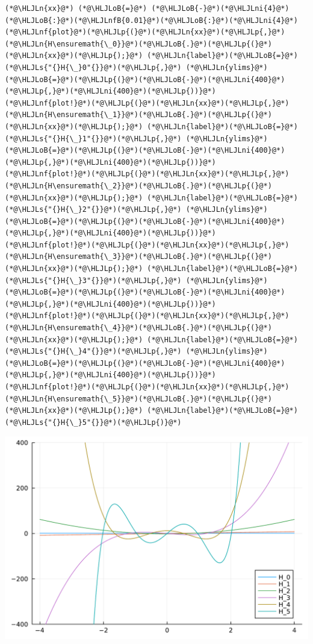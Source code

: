\documentclass[12pt,a4paper]{article}
\newcommand{\HLJLn}[1]{#1}
\newcommand{\HLJLnf}[1]{\textcolor[RGB]{66,102,213}{#1}}
\newcommand{\HLJLs}[1]{\textcolor[RGB]{201,61,57}{#1}}
\newcommand{\HLJLnfB}[1]{\textcolor[RGB]{59,151,46}{#1}}
\newcommand{\HLJLni}[1]{\textcolor[RGB]{59,151,46}{#1}}
\newcommand{\HLJLoB}[1]{\textcolor[RGB]{102,102,102}{\textbf{#1}}}
\newcommand{\HLJLp}[1]{#1}
\begin{document}
\begin{lstlisting}
(*@\HLJLn{xx}@*) (*@\HLJLoB{=}@*) (*@\HLJLoB{-}@*)(*@\HLJLni{4}@*)(*@\HLJLoB{:}@*)(*@\HLJLnfB{0.01}@*)(*@\HLJLoB{:}@*)(*@\HLJLni{4}@*)
(*@\HLJLnf{plot}@*)(*@\HLJLp{(}@*)(*@\HLJLn{xx}@*)(*@\HLJLp{,}@*) (*@\HLJLn{H\ensuremath{\_0}}@*)(*@\HLJLoB{.}@*)(*@\HLJLp{(}@*)(*@\HLJLn{xx}@*)(*@\HLJLp{);}@*) (*@\HLJLn{label}@*)(*@\HLJLoB{=}@*)(*@\HLJLs{"{}H{\_}0"{}}@*)(*@\HLJLp{,}@*) (*@\HLJLn{ylims}@*)(*@\HLJLoB{=}@*)(*@\HLJLp{(}@*)(*@\HLJLoB{-}@*)(*@\HLJLni{400}@*)(*@\HLJLp{,}@*)(*@\HLJLni{400}@*)(*@\HLJLp{))}@*)
(*@\HLJLnf{plot!}@*)(*@\HLJLp{(}@*)(*@\HLJLn{xx}@*)(*@\HLJLp{,}@*) (*@\HLJLn{H\ensuremath{\_1}}@*)(*@\HLJLoB{.}@*)(*@\HLJLp{(}@*)(*@\HLJLn{xx}@*)(*@\HLJLp{);}@*) (*@\HLJLn{label}@*)(*@\HLJLoB{=}@*)(*@\HLJLs{"{}H{\_}1"{}}@*)(*@\HLJLp{,}@*) (*@\HLJLn{ylims}@*)(*@\HLJLoB{=}@*)(*@\HLJLp{(}@*)(*@\HLJLoB{-}@*)(*@\HLJLni{400}@*)(*@\HLJLp{,}@*)(*@\HLJLni{400}@*)(*@\HLJLp{))}@*)
(*@\HLJLnf{plot!}@*)(*@\HLJLp{(}@*)(*@\HLJLn{xx}@*)(*@\HLJLp{,}@*) (*@\HLJLn{H\ensuremath{\_2}}@*)(*@\HLJLoB{.}@*)(*@\HLJLp{(}@*)(*@\HLJLn{xx}@*)(*@\HLJLp{);}@*) (*@\HLJLn{label}@*)(*@\HLJLoB{=}@*)(*@\HLJLs{"{}H{\_}2"{}}@*)(*@\HLJLp{,}@*) (*@\HLJLn{ylims}@*)(*@\HLJLoB{=}@*)(*@\HLJLp{(}@*)(*@\HLJLoB{-}@*)(*@\HLJLni{400}@*)(*@\HLJLp{,}@*)(*@\HLJLni{400}@*)(*@\HLJLp{))}@*)
(*@\HLJLnf{plot!}@*)(*@\HLJLp{(}@*)(*@\HLJLn{xx}@*)(*@\HLJLp{,}@*) (*@\HLJLn{H\ensuremath{\_3}}@*)(*@\HLJLoB{.}@*)(*@\HLJLp{(}@*)(*@\HLJLn{xx}@*)(*@\HLJLp{);}@*) (*@\HLJLn{label}@*)(*@\HLJLoB{=}@*)(*@\HLJLs{"{}H{\_}3"{}}@*)(*@\HLJLp{,}@*) (*@\HLJLn{ylims}@*)(*@\HLJLoB{=}@*)(*@\HLJLp{(}@*)(*@\HLJLoB{-}@*)(*@\HLJLni{400}@*)(*@\HLJLp{,}@*)(*@\HLJLni{400}@*)(*@\HLJLp{))}@*)
(*@\HLJLnf{plot!}@*)(*@\HLJLp{(}@*)(*@\HLJLn{xx}@*)(*@\HLJLp{,}@*) (*@\HLJLn{H\ensuremath{\_4}}@*)(*@\HLJLoB{.}@*)(*@\HLJLp{(}@*)(*@\HLJLn{xx}@*)(*@\HLJLp{);}@*) (*@\HLJLn{label}@*)(*@\HLJLoB{=}@*)(*@\HLJLs{"{}H{\_}4"{}}@*)(*@\HLJLp{,}@*) (*@\HLJLn{ylims}@*)(*@\HLJLoB{=}@*)(*@\HLJLp{(}@*)(*@\HLJLoB{-}@*)(*@\HLJLni{400}@*)(*@\HLJLp{,}@*)(*@\HLJLni{400}@*)(*@\HLJLp{))}@*)
(*@\HLJLnf{plot!}@*)(*@\HLJLp{(}@*)(*@\HLJLn{xx}@*)(*@\HLJLp{,}@*) (*@\HLJLn{H\ensuremath{\_5}}@*)(*@\HLJLoB{.}@*)(*@\HLJLp{(}@*)(*@\HLJLn{xx}@*)(*@\HLJLp{);}@*) (*@\HLJLn{label}@*)(*@\HLJLoB{=}@*)(*@\HLJLs{"{}H{\_}5"{}}@*)(*@\HLJLp{)}@*)
\end{lstlisting}

\includegraphics[width=\linewidth]{jl_dOthw0/OP_methods_10_1.pdf}
\end{document}

